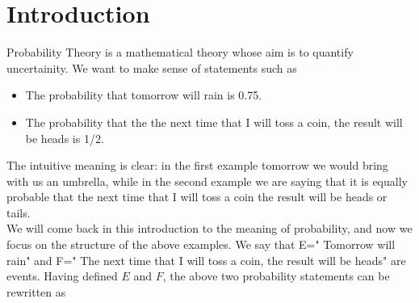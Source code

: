 \documentclass[12pt]{article}
\newcommand{\<}{{\langle \!\! \langle}}
\renewcommand{\>}{{\rangle \!\! \rangle}}
\begin{document}


\section{Introduction}

Probability Theory is a mathematical theory whose aim is to quantify uncertainity. We want to make sense of statements such as  
\begin{itemize}

	\item  The probability that tomorrow will rain is 0.75.\\
	\item  The probability that the the next time that I will toss a coin, the result will be heads is 1/2.\\ 

\end{itemize}

The intuitive meaning is clear: in the first example tomorrow we would bring with us an umbrella, while in the second example we are saying that it is equally probable that the next time that I will toss a coin the result will be heads or tails. \\
We will come back in this introduction to the meaning of probability, and now we focus on the structure of the above examples. We say that  E=" Tomorrow will rain" and F=" The next time that I will toss a coin, the result will be heads" are events. Having defined $E$ and $F$, the above two probability statements can be rewritten as 
\end{document}
